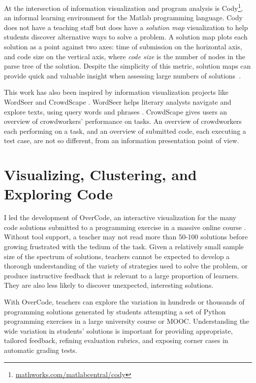 \documentclass{sigchi}
\begin{document}
At the intersection of information visualization and program analysis is Cody\footnote{\url{mathworks.com/matlabcentral/cody}}, an informal learning environment for the Matlab programming language. Cody does not have a teaching staff but does have a {\em solution map} visualization to help students discover alternative ways to solve a problem. A solution map plots each solution as a point against two axes: time of submission on the horizontal axis, and code size on the vertical axis, where \textit{code size} is the number of nodes in the parse tree of the solution. Despite the simplicity of this metric, solution maps can provide quick and valuable insight when assessing large numbers of solutions~\cite{ICERGlassman}.

This work has also been inspired by information visualization projects like WordSeer \cite{wordseerlitcomp13,wordseercikm13} and CrowdScape \cite{crowdscape}. WordSeer helps literary analysts navigate and explore texts, using query words and phrases \cite{wordseerhcir11}. CrowdScape gives users an overview of crowdworkers' performance on tasks. An overview of crowdworkers each performing on a task, and an overview of submitted code, each executing a test case, are not so different, from an information presentation point of view.

\section{Visualizing, Clustering, and Exploring Code}
I led the development of OverCode, an interactive visualization for the many code solutions submitted to a programming exercise in a massive online course \cite{OverCode}. Without tool support, a teacher may not read more than 50-100 solutions before growing frustrated with the tedium of the task. Given a relatively small sample size of the spectrum of solutions, teachers cannot be expected to develop a thorough understanding of the variety of strategies used to solve the problem, or produce instructive feedback that is relevant to a large proportion of learners. They are also less likely to discover unexpected, interesting solutions.

With OverCode, teachers can explore the variation in hundreds or thousands of programming solutions generated by students attempting a set of Python programming exercises in a large university course or MOOC. Understanding the wide variation in students' solutions is important for providing appropriate, tailored feedback, refining evaluation rubrics, and exposing corner cases in automatic grading tests.
\end{document}

